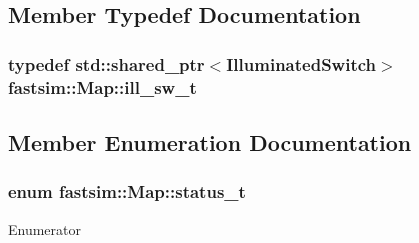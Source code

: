 \subsection{Member Typedef Documentation}
\subsubsection[{\texorpdfstring{ill\+\_\+sw\+\_\+t}{ill_sw_t}}]{\setlength{\rightskip}{0pt plus 5cm}typedef std\+::shared\+\_\+ptr$<${\bf Illuminated\+Switch}$>$ {\bf fastsim\+::\+Map\+::ill\+\_\+sw\+\_\+t}}\hypertarget{classfastsim_1_1_map_a998d356ac6ce470e714e8945150eac6e}{}\label{classfastsim_1_1_map_a998d356ac6ce470e714e8945150eac6e}


\subsection{Member Enumeration Documentation}
\subsubsection[{\texorpdfstring{status\+\_\+t}{status_t}}]{\setlength{\rightskip}{0pt plus 5cm}enum {\bf fastsim\+::\+Map\+::status\+\_\+t}}\hypertarget{classfastsim_1_1_map_ae0ff811304fed4a4ca33e4676534a9aa}{}\label{classfastsim_1_1_map_ae0ff811304fed4a4ca33e4676534a9aa}
\begin{Desc}
\item[Enumerator]\par
\begin{description}
\item[{\em 
free\hypertarget{classfastsim_1_1_map_ae0ff811304fed4a4ca33e4676534a9aaa734d9138767d64430ca5ed54d15809fe}{}\label{classfastsim_1_1_map_ae0ff811304fed4a4ca33e4676534a9aaa734d9138767d64430ca5ed54d15809fe}
}]\item[{\em 
obstacle\hypertarget{classfastsim_1_1_map_ae0ff811304fed4a4ca33e4676534a9aaab3747fd718def41be345baf801721804}{}\label{classfastsim_1_1_map_ae0ff811304fed4a4ca33e4676534a9aaab3747fd718def41be345baf801721804}
}]\end{description}
\end{Desc}


